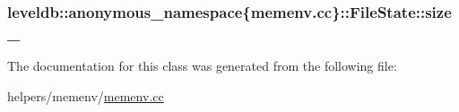 \subsubsection[{size\+\_\+}]{ leveldb\+::anonymous\+\_\+namespace\{memenv.\+cc\}\+::File\+State\+::size\+\_\+\hspace{0.3cm}{\ttfamily [private]}}\label{classleveldb_1_1anonymous__namespace_02memenv_8cc_03_1_1_file_state_a71d1580717585cf6f85862c91c440eb3}


The documentation for this class was generated from the following file\+:\begin{DoxyCompactItemize}
\item 
helpers/memenv/\hyperlink{memenv_8cc}{memenv.\+cc}\end{DoxyCompactItemize}

